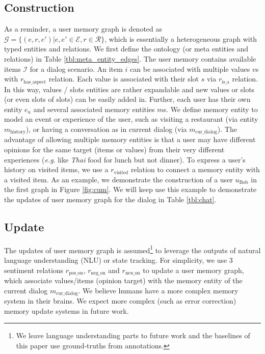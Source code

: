 \documentclass[11pt,a4paper]{article}
\makeatletter
\DeclareRobustCommand\onedot{\futurelet\@let@token\@onedot}
\def\onedot{. }
\def\eg{\emph{e.g}\onedot} \def\Eg{\emph{E.g}\onedot}
\makeatother
\begin{document}
\subsection{Construction}
As a reminder, a user memory graph is denoted as $\mathcal{G} = \{(e, r, e')\vert e, e' \in \mathcal{E}, r \in \mathcal{R} \}$, which is essentially a heterogeneous graph with typed entities and relations.
We first define the ontology (or meta entities and relations) in Table \ref{tbl:meta_entity_edges}.
The user memory contains available items $\mathcal{I}$ for a dialog scenario.
An item $i$ can be associated with multiple values $v$s with $r_\text{has\_aspect}$ relation.
Each value is associated with their slot $s$ via $r_\text{is\_a}$ relation.
In this way, values / slots entities are rather expandable and new values or slots (or even slots of slots) can be easily added in.
Further, each user has their own entity $e_u$ and several associated memory entities $m$s.
We define memory entity to model an event or experience of the user, such as visiting a restaurant (via entity $m_\text{history}$), or having a conversation as in current dialog (via $m_\text{cur\_dialog}$).
The advantage of allowing multiple memory entities is that a user may have different opinions for the same target (items or values) from their very different experiences (\eg like \textit{Thai} food for lunch but not dinner). 
To express a user's history on visited items, we use a $r_\text{visited}$ relation to connect a memory entity with a visited item.
As an example, we demonstrate the construction of a user $u_\text{Bob}$ in the first graph in Figure \ref{fig:cum}. 
We will keep use this example to demonstrate the updates of user memory graph for the dialog in Table \ref{tbl:chat}.

\subsection{Update}
The updates of user memory graph is assumed\footnote{We leave language understanding parts to future work and the baselines of this paper use ground-truths from annotations.} to leverage the outputs of natural language understanding (NLU) or state tracking.
For simplicity, we use 3 sentiment relations $r_\text{pos\_on}$, $r_\text{neg\_on}$ and $r_\text{neu\_on}$ to update a user memory graph, which associate values/items (opinion target) with the memory entity of the current dialog $m_\text{cur\_dialog}$.
We believe humans have a more complex memory system in their brains. We expect more complex (such as error correction) memory update systems in future work.
\end{document}
